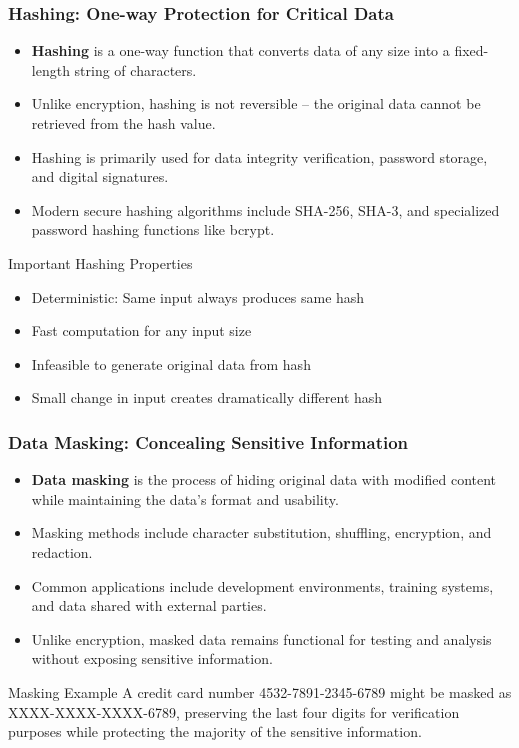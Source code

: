 \documentclass{beamer}
\begin{document}
\begin{frame}
\frametitle{Hashing: One-way Protection for Critical Data}
\begin{itemize}
    \item \textbf{Hashing} is a one-way function that converts data of any size into a fixed-length string of characters.
    \item Unlike encryption, hashing is not reversible – the original data cannot be retrieved from the hash value.
    \item Hashing is primarily used for data integrity verification, password storage, and digital signatures.
    \item Modern secure hashing algorithms include SHA-256, SHA-3, and specialized password hashing functions like bcrypt.
\end{itemize}

\begin{block}{Important Hashing Properties}
    \begin{itemize}
        \item Deterministic: Same input always produces same hash
        \item Fast computation for any input size
        \item Infeasible to generate original data from hash
        \item Small change in input creates dramatically different hash
    \end{itemize}
\end{block}
\end{frame}

\begin{frame}
\frametitle{Data Masking: Concealing Sensitive Information}
\begin{itemize}
    \item \textbf{Data masking} is the process of hiding original data with modified content while maintaining the data's format and usability.
    \item Masking methods include character substitution, shuffling, encryption, and redaction.
    \item Common applications include development environments, training systems, and data shared with external parties.
    \item Unlike encryption, masked data remains functional for testing and analysis without exposing sensitive information.
\end{itemize}

\begin{exampleblock}{Masking Example}
A credit card number 4532-7891-2345-6789 might be masked as XXXX-XXXX-XXXX-6789, preserving the last four digits for verification purposes while protecting the majority of the sensitive information.
\end{exampleblock}
\end{frame}
\end{document}
